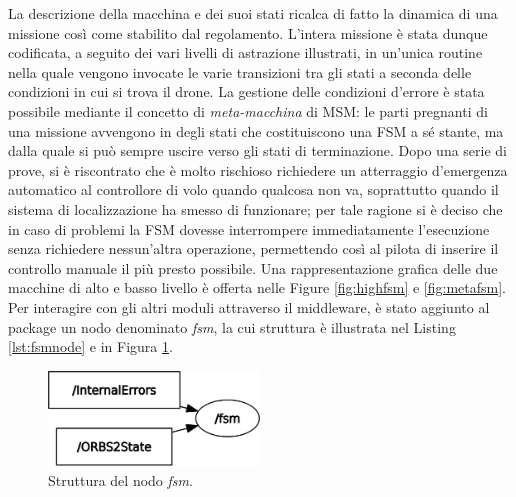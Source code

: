 La descrizione della macchina e dei suoi stati ricalca di fatto la dinamica di una missione così come stabilito dal regolamento. L'intera missione è stata dunque codificata, a seguito dei vari livelli di astrazione illustrati, in un'unica routine nella quale vengono invocate le varie transizioni tra gli stati a seconda delle condizioni in cui si trova il drone. La gestione delle condizioni d'errore è stata possibile mediante il concetto di \emph{meta-macchina} di MSM: le parti pregnanti di una missione avvengono in degli stati che costituiscono una FSM a sé stante, ma dalla quale si può sempre uscire verso gli stati di terminazione. Dopo una serie di prove, si è riscontrato che è molto rischioso richiedere un atterraggio d'emergenza automatico al controllore di volo quando qualcosa non va, soprattutto quando il sistema di localizzazione ha smesso di funzionare; per tale ragione si è deciso che in caso di problemi la FSM dovesse interrompere immediatamente l'esecuzione senza richiedere nessun'altra operazione, permettendo così al pilota di inserire il controllo manuale il più presto possibile. Una rappresentazione grafica delle due macchine di alto e basso livello è offerta nelle Figure \ref{fig:highfsm} e \ref{fig:metafsm}.\\
Per interagire con gli altri moduli attraverso il middleware, è stato aggiunto al package un nodo denominato \emph{fsm}, la cui struttura è illustrata nel Listing \ref{lst:fsmnode} e in Figura \ref{fig:fsmnode}.
\newpage

\begin{figure}
    \centering
    \includegraphics[width=0.5\textwidth]{figs/chapter3/fsm.png}
    \caption{Struttura del nodo \emph{fsm}.}
    \label{fig:fsmnode}
\end{figure}


